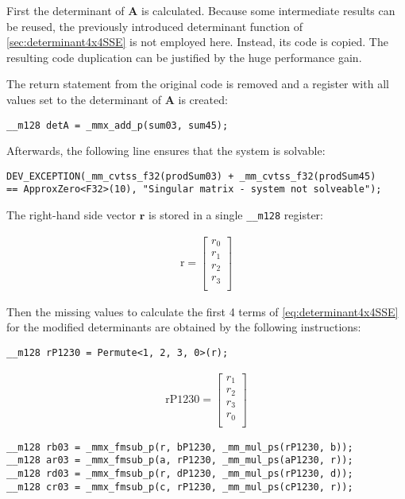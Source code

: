 First the determinant of $\mathbf{A}$ is calculated.
Because some intermediate results can be reused, the previously introduced determinant function of \cref{sec:determinant4x4SSE} is not employed here. 
Instead, its code is copied. 
The resulting code duplication can be justified by the huge performance gain.

The return statement from the original code is removed and a register with all values set to the determinant of $\mathbf{A}$ is created:

\begin{verbatim}
__m128 detA = _mmx_add_p(sum03, sum45);
\end{verbatim}

Afterwards, the following line ensures that the system is solvable:

\begin{verbatim}
DEV_EXCEPTION(_mm_cvtss_f32(prodSum03) + _mm_cvtss_f32(prodSum45) 
== ApproxZero<F32>(10), "Singular matrix - system not solveable");
\end{verbatim} 

The right-hand side vector $\mathbf{r}$ is stored in a single \texttt{__m128} register:


\begin{align*}
\mathrm{r} 
=
\begin{bmatrix}
r_0\\
r_1\\
r_2\\
r_3\\
\end{bmatrix}
\end{align*}


Then the missing values to calculate the first 4 terms of \cref{eq:determinant4x4SSE} for the modified determinants are obtained by the following instructions:

\begin{verbatim}
__m128 rP1230 = Permute<1, 2, 3, 0>(r);
\end{verbatim}


\begin{align*}
\mathrm{rP1230} 
=
\begin{bmatrix}
r_1\\
r_2\\
r_3\\
r_0\\
\end{bmatrix}
\end{align*}


\begin{verbatim}
__m128 rb03 = _mmx_fmsub_p(r, bP1230, _mm_mul_ps(rP1230, b));
__m128 ar03 = _mmx_fmsub_p(a, rP1230, _mm_mul_ps(aP1230, r));
__m128 rd03 = _mmx_fmsub_p(r, dP1230, _mm_mul_ps(rP1230, d));
__m128 cr03 = _mmx_fmsub_p(c, rP1230, _mm_mul_ps(cP1230, r));
\end{verbatim}

